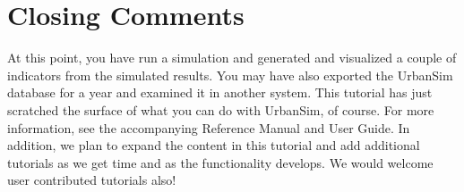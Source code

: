 \documentclass{howto}
\begin{document}








\section*{Closing Comments}

At this point, you have run a simulation and generated and
visualized a couple of indicators from the simulated results. You
may have also exported the UrbanSim database for a year and examined
it in another system. This tutorial has just scratched the
surface of what you can do with UrbanSim, of course. For more information,
see the accompanying Reference Manual and User Guide. In addition,
we plan to expand the content in this tutorial and add additional
tutorials as we get time and as the functionality develops.  We
would welcome user contributed tutorials also!
\end{document}
